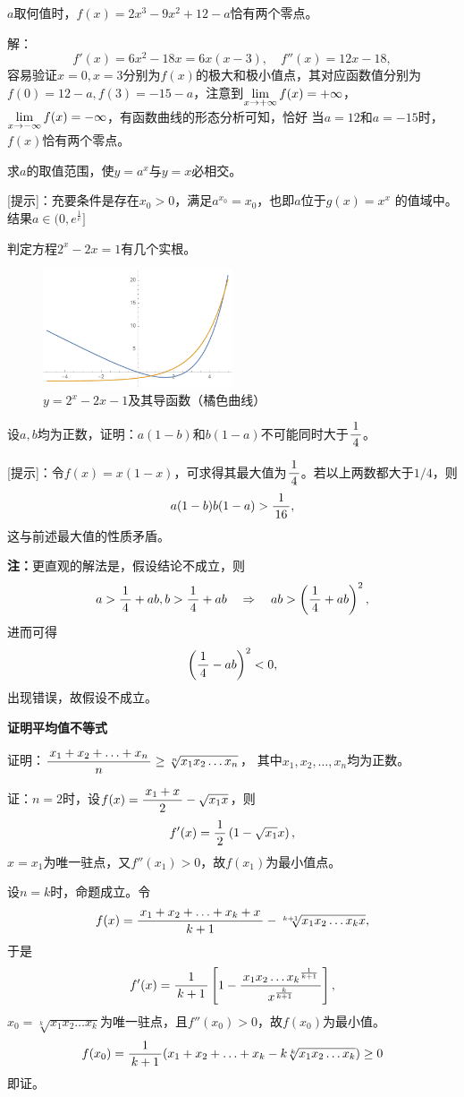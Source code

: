 \egz $a$取何值时，$f(x)=2x^3-9x^2+12-a$恰有两个零点。

解：
$$f'(x)=6x^2-18x=6x(x-3),\quad 
f''(x)=12x-18,$$
容易验证$x=0,x=3$分别为$f(x)$的极大和极小值点，其对应函数值分别为
$f(0)=12-a,f(3)=-15-a$，注意到$\lim\limits_{x\to{+\infty}}f(x)=+\infty$，
$\lim\limits_{x\to{-\infty}}f(x)=-\infty$，有函数曲线的形态分析可知，恰好
当$a=12$和$a=-15$时，$f(x)$恰有两个零点。\fin

\egz 求$a$的取值范围，使$y=a^x$与$y=x$必相交。

[提示]：充要条件是存在$x_0>0$，满足$a^{x_0}=x_0$，也即$a$位于$g(x)=x^{x}$
的值域中。结果$a\in(0,e^{\frac1e}]$

\egz 判定方程$2^x-2x=1$有几个实根。
	
\begin{figure}[h]
	\centering
	\includegraphics[width=0.5\textwidth]
	{./Images/Ch03/2x2x.pdf}
	\caption{$y=2^x-2x-1$及其导函数（橘色曲线）}
	\label{fig:2x2x1}
\end{figure}

\egz 设$a,b$均为正数，证明：$a(1-b)$和$b(1-a)$不可能同时大于$\displaystyle\frac{\,{1}\,}{\,{4}\,}$。

[提示]：令$f(x)=x(1-x)$，可求得其最大值为$\displaystyle\frac{\,{1}\,}{\,{4}\,}$。若以上两数都大于$1/4$，则
$$a(1-b)b(1-a)>\displaystyle\frac{\,{1}\,}{\,{16}\,},$$
这与前述最大值的性质矛盾。

{\bf 注：}更直观的解法是，假设结论不成立，则
$$a>\displaystyle\frac{\,{1}\,}{\,{4}\,}+ab,b>\displaystyle\frac{\,{1}\,}{\,{4}\,}+ab\quad\Rightarrow\quad
ab>\left(\displaystyle\frac{\,{1}\,}{\,{4}\,}+ab\right)^2,$$
进而可得
$$\left(\displaystyle\frac{\,{1}\,}{\,{4}\,}-ab\right)^2<0,$$
出现错误，故假设不成立。

% 

\begin{shaded}
{\bf 证明平均值不等式}

\egz 证明：$\displaystyle\frac{\,{x_1+x_2+\ldots+x_n}\,}{\,{n}\,}\geq\sqrt[n]{x_1x_2\ldots x_n}$，
其中$x_1,x_2,\ldots,x_n$均为正数。

证：$n=2$时，设$f(x)=\displaystyle\frac{\,{x_1+x}\,}{\,{2}\,}-\sqrt{x_1x}$，则
$$f'(x)=\displaystyle\frac{\,{1}\,}{\,{2}\,}\left(1-\sqrt{x_1}x\right),$$
$x=x_1$为唯一驻点，又$f''(x_1)>0$，故$f(x_1)$为最小值点。

设$n=k$时，命题成立。令
$$f(x)=\displaystyle\frac{\,{x_1+x_2+\ldots+x_k+x}\,}{\,{k+1}\,}-\sqrt[k+1]{x_1x_2\ldots x_kx},$$
于是
$$f'(x)=\displaystyle\frac{\,{1}\,}{\,{k+1}\,}\left[1-\displaystyle\frac{\,{{x_1x_2\ldots x_k}^{\frac1{k+1}}}\,}{\,{x^{\frac k{k+1}}}\,}\right],$$
$x_0=\sqrt[k]{x_1x_2\ldots x_k}$为唯一驻点，且$f''(x_0)>0$，故$f(x_0)$为最小值。
$$f(x_0)=\displaystyle\frac{\,{1}\,}{\,{k+1}\,}(x_1+x_2+\ldots+x_k-k\sqrt[k]{x_1x_2\ldots x_k})\geq 0$$
即证。
\end{shaded}

